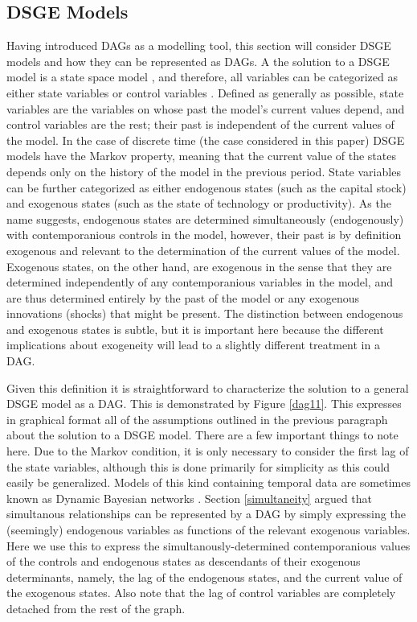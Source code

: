 \documentclass{article}
\begin{document}
\subsection{DSGE Models} \label{dsge}

Having introduced DAGs as a modelling tool, this section will consider DSGE models and how they can be represented as DAGs. A the solution to a DSGE model is a state space model \parencite{hamilton1994state}, and therefore, all variables can be categorized as either state variables or control variables \parencite{fernandez2016solution}. Defined as generally as possible, state variables are the variables on whose past the model's current values depend, and control variables are the rest; their past is independent of the current values of the model. In the case of discrete time (the case considered in this paper) DSGE models have the Markov property, meaning that the current value of the states depends only on the history of the model in the previous period. State variables can be further categorized as either endogenous states (such as the capital stock) and exogenous states (such as the state of technology or productivity). As the name suggests, endogenous states are determined simultaneously (endogenously) with contemporanious controls in the model, however, their past is by definition exogenous and relevant to the determination of the current values of the model. Exogenous states, on the other hand, are exogenous in the sense that they are determined independently of any contemporanious variables in the model, and are thus determined entirely by the past of the model or any exogenous innovations (shocks) that might be present. The distinction between endogenous and exogenous states is subtle, but it is important here because the different implications about exogeneity will lead to a slightly different treatment in a DAG.

Given this definition it is straightforward to characterize the solution to a general DSGE model as a DAG. This is demonstrated by Figure \ref{dag11}. This expresses in graphical format all of the assumptions outlined in the previous paragraph about the solution to a DSGE model. There are a few important things to note here. Due to the Markov condition, it is only necessary to consider the first lag of the state variables, although this is done primarily for simplicity as this could easily be generalized. Models of this kind containing temporal data are sometimes known as Dynamic Bayesian networks \parencite{ghahramani1997learning}. Section \ref{simultaneity} argued that simultanous relationships can be represented by a DAG by simply expressing the (seemingly) endogenous variables as functions of the relevant exogenous variables. Here we use this to express the simultanously-determined contemporanious values of the controls and endogenous states as descendants of their exogenous determinants, namely, the lag of the endogenous states, and the current value of the exogenous states. Also note that the lag of control variables are completely detached from the rest of the graph.
\end{document}
